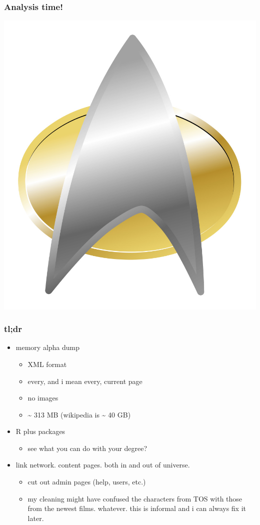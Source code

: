 \documentclass{beamer}
\begin{document}
\begin{frame}
  \frametitle{Analysis time!}
  \begin{center}
    \includegraphics[height = 0.8\textheight, width = \textwidth, keepaspectratio = true]{figure/star-trek-insignia}
  \end{center}
\end{frame}

\begin{frame}
  \frametitle{tl;dr}
  \begin{itemize}
    \item memory alpha dump
      \begin{itemize}
        \item XML format
        \item every, and i mean every, current page
        \item no images
        \item \~{} 313 MB (wikipedia is \~{} 40 GB)
      \end{itemize}
    \item R plus packages
      \begin{itemize}
        \item see what you can do with your degree?
      \end{itemize}
    \item link network. content pages. both in and out of universe.
      \begin{itemize}
        \item cut out admin pages (help, users, etc.)
        \item my cleaning might have confused the characters from TOS with those from the newest films. whatever. this is informal and i can always fix it later. 
      \end{itemize}
  \end{itemize}
\end{frame}
\end{document}
